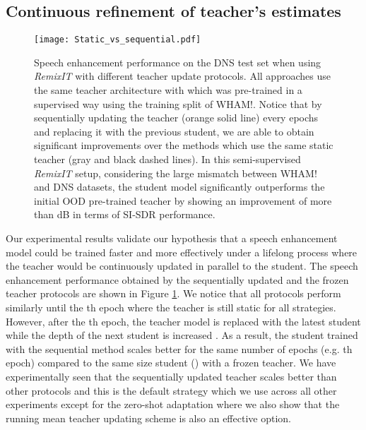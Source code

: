 \documentclass{article}
\begin{document}
\subsection{Continuous refinement of teacher's estimates}
\label{sec:results:semi_sup}

\begin{figure}[htb!]
    \centering
      \texttt{[image: Static\_vs\_sequential.pdf]}
      \caption{Speech enhancement performance on the DNS test set when using \textit{RemixIT} with different teacher update protocols. All approaches use the same teacher architecture with  which was pre-trained in a supervised way using the training split of WHAM!. Notice that by sequentially updating the teacher (orange solid line) every  epochs and replacing it with the previous student, we are able to obtain significant improvements over the methods which use the same static teacher (gray and black dashed lines). In this semi-supervised \textit{RemixIT} setup, considering the large mismatch between WHAM! and DNS datasets, the student model significantly outperforms the initial OOD pre-trained teacher by showing an improvement of more than  dB in terms of SI-SDR performance.}
      \label{fig:static_vs_sequential}
\end{figure}

Our experimental results validate our hypothesis that a speech enhancement model could be trained faster and more effectively under a lifelong process where the teacher would be continuously updated in parallel to the student. The speech enhancement performance obtained by the sequentially updated and the frozen teacher protocols are shown in Figure \ref{fig:static_vs_sequential}. We notice that all protocols perform similarly until the th epoch where the teacher is still static for all strategies. However, after the th epoch, the teacher model is replaced with the latest student while the depth of the next student is increased . As a result, the student trained with the sequential method scales better for the same number of epochs (e.g. th epoch) compared to the same size student () with a frozen teacher. We have experimentally seen that the sequentially updated teacher scales better than other protocols and this is the default strategy which we use across all other experiments except for the zero-shot adaptation where we also show that the running mean teacher updating scheme is also an effective option.
\end{document}
